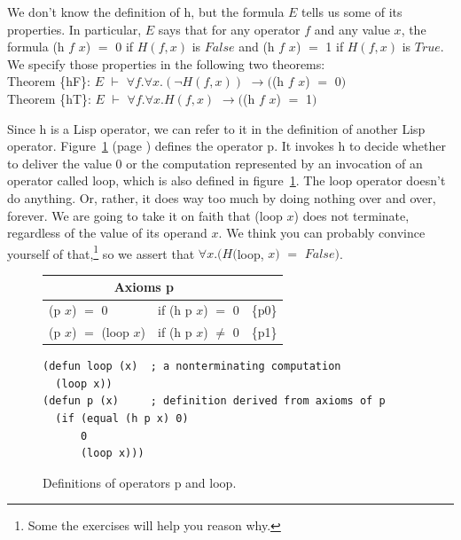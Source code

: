 We don't know the definition of \textsf{h}, but the formula $E$
tells us some of its properties.
In particular, $E$ says that for any operator $f$ and any value $x$,
the formula \textsf{(h $f$ $x$)} $=$ \textsf{0} if $H(f, x)$ is $False$ and
\textsf{(h $f$ $x$)} $=$ \textsf{1} if $H(f,x)$ is $True$.
We specify those properties in the following two theorems:
\vspace{2mm}\\
\hspace*{5mm}Theorem \{hF\}: $E$ $\vdash$ $\forall f.\forall x.(\neg H(f, x))$ $\rightarrow ($\textsf{(h $f$ $x$)} $=$ \textsf{0}$)$\\
\hspace*{5mm}Theorem \{hT\}: $E$ $\vdash$ $\forall f.\forall x.H(f, x)$      $\rightarrow ($\textsf{(h $f$ $x$)} $=$ \textsf{1}$)$
\vspace{2mm}

Since \textsf{h} is a Lisp operator, we can refer to it in the definition of
another Lisp operator.
Figure~\ref{fig:paradox-op-defun} (page \pageref{fig:paradox-op-defun})
defines the operator \textsf{p}.
It invokes \textsf{h} to decide whether to deliver the value \textsf{0} or
the computation represented by an invocation of an operator called \textsf{loop},
which is also defined in
figure~\ref{fig:paradox-op-defun}.
The \textsf{loop} operator doesn't do anything. %
Or, rather,
it does way too much by doing nothing over and over, forever.
We are going to take it on faith that \textsf{(loop $x$)} does not terminate,
regardless of the value of its operand $x$.
We think you can probably convince yourself of that,\footnote{Some
the exercises will help you reason why.}
so we assert that $\forall x.(H($\textsf{loop}, $x)$ $=$ $False)$.

\begin{figure}
\begin{center}
\begin{tabular}{lll}
\multicolumn{2}{c}{Axioms \textsf{p}}\\
\hline
\textsf{(p $x$)} $=$ \textsf{0}          & if \textsf{(h p $x$)} $=$ \textsf{0}    &\{p0\}\\
\textsf{(p $x$)} $=$ \textsf{(loop $x$)} & if \textsf{(h p $x$)} $\neq$ \textsf{0} &\{p1\}\\
\end{tabular}
\begin{code}
\begin{verbatim}
(defun loop (x)  ; a nonterminating computation
  (loop x))
(defun p (x)     ; definition derived from axioms of p
  (if (equal (h p x) 0)
      0
      (loop x)))
\end{verbatim}
\end{code}
\end{center}
\caption{Definitions of operators \textsf{p} and \textsf{loop}.}
\label{fig:paradox-op-defun}
\end{figure}

